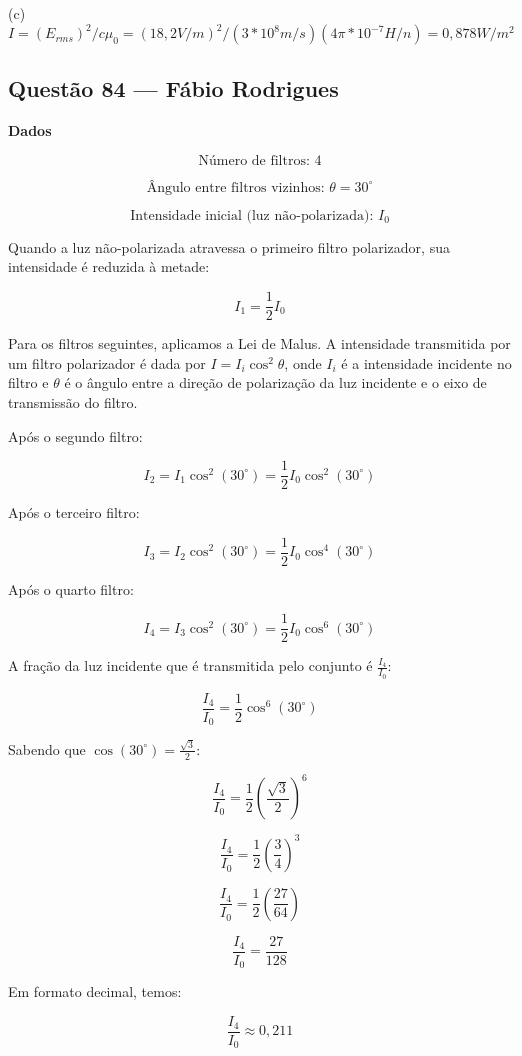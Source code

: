 \documentclass[12pt,a4paper]{article}
\begin{document}
(c)
\[
I = (E_{rms})^2/c\mu_{0} = 
(18,2 V/m)^2/(3 * 10^8 m/s)(4\pi * 10^{-7} H/n)
= 0,878 W/m^2
\]

\subsection{Questão 84 — Fábio Rodrigues}
\textbf{Dados}

\[
\text{Número de filtros: } 4
\]

\[
\text{Ângulo entre filtros vizinhos: } \theta = 30^\circ
\]

\[
\text{Intensidade inicial (luz não-polarizada): } I_0
\]

Quando a luz não-polarizada atravessa o primeiro filtro polarizador, sua intensidade é reduzida à metade:

\[
I_1 = \frac{1}{2} I_0
\]

Para os filtros seguintes, aplicamos a Lei de Malus. A intensidade transmitida por um filtro polarizador é dada por \(I = I_i \cos^2 \theta\), onde \(I_i\) é a intensidade incidente no filtro e \(\theta\) é o ângulo entre a direção de polarização da luz incidente e o eixo de transmissão do filtro.

Após o segundo filtro:

\[
I_2 = I_1 \cos^2(30^\circ) = \frac{1}{2} I_0 \cos^2(30^\circ)
\]

Após o terceiro filtro:

\[
I_3 = I_2 \cos^2(30^\circ) = \frac{1}{2} I_0 \cos^4(30^\circ)
\]

Após o quarto filtro:

\[
I_4 = I_3 \cos^2(30^\circ) = \frac{1}{2} I_0 \cos^6(30^\circ)
\]

A fração da luz incidente que é transmitida pelo conjunto é \(\frac{I_4}{I_0}\):

\[
\frac{I_4}{I_0} = \frac{1}{2} \cos^6(30^\circ)
\]

Sabendo que \(\cos(30^\circ) = \frac{\sqrt{3}}{2}\):

\[
\frac{I_4}{I_0} = \frac{1}{2} \left( \frac{\sqrt{3}}{2} \right)^6
\]

\[
\frac{I_4}{I_0} = \frac{1}{2} \left( \frac{3}{4} \right)^3
\]

\[
\frac{I_4}{I_0} = \frac{1}{2} \left( \frac{27}{64} \right)
\]

\[
\frac{I_4}{I_0} = \frac{27}{128}
\]

Em formato decimal, temos:

\[
\frac{I_4}{I_0} \approx 0,211
\]
\end{document}

